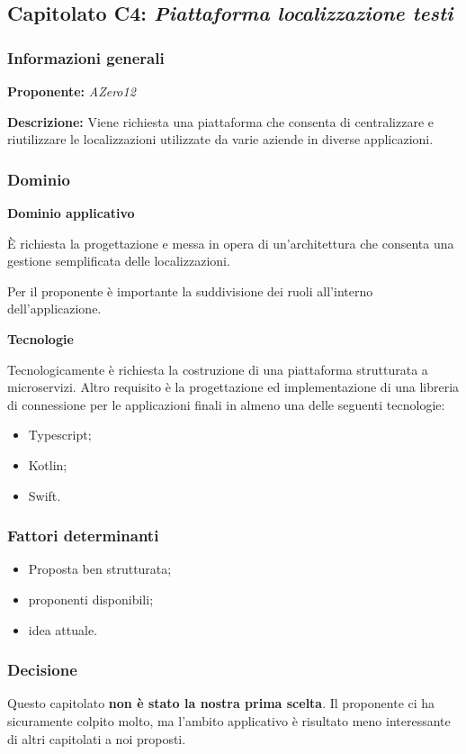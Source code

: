 \subsection{Capitolato C4: \textit{Piattaforma localizzazione testi}}

\subsubsection{Informazioni generali}

\textbf{Proponente:} \textit{AZero12}

\textbf{Descrizione:} Viene richiesta una piattaforma che consenta di centralizzare e riutilizzare le localizzazioni utilizzate da varie aziende in diverse applicazioni. 
\subsubsection{Dominio}

\textbf{Dominio applicativo}

È richiesta la progettazione e messa in opera di un'architettura che consenta una gestione semplificata delle localizzazioni.

Per il proponente è importante la suddivisione dei ruoli all'interno dell'applicazione.

\textbf{Tecnologie}

Tecnologicamente è richiesta la costruzione di una piattaforma strutturata a microservizi. Altro requisito è la progettazione ed implementazione di una libreria di connessione per le applicazioni finali in almeno una delle seguenti tecnologie:
\begin{itemize}
    \item Typescript;
    \item Kotlin;
    \item Swift.
\end{itemize}

\subsubsection{Fattori determinanti}
\begin{itemize}
    \item Proposta ben strutturata;
    \item proponenti disponibili;
    \item idea attuale.
\end{itemize}

\subsubsection{Decisione}
Questo capitolato \textbf{non è stato la nostra prima scelta}. Il proponente ci ha sicuramente colpito molto, ma l'ambito applicativo è risultato meno interessante di altri capitolati a noi proposti.
